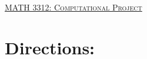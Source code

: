 \documentclass[11pt, a4paper]{article}
\renewcommand*{\arraystretch}{.5}
\begin{document}
\begin{center}
{\Large \underline{\textsc{MATH 3312:  Computational Project}}}
\end{center}


\section*{Directions:}
\end{document}
